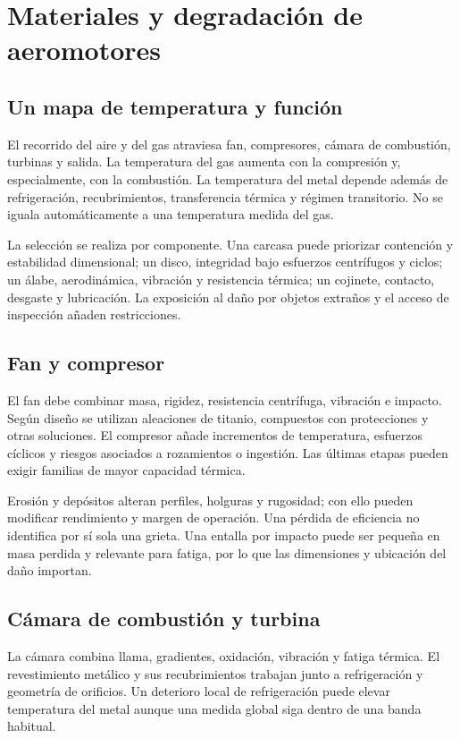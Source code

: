 \chapter{Materiales y degradación de aeromotores}\label{ch:10}
\section{Un mapa de temperatura y función}
El recorrido del aire y del gas atraviesa fan, compresores, cámara de combustión, turbinas y salida. La temperatura del gas aumenta con la compresión y, especialmente, con la combustión. La temperatura del metal depende además de refrigeración, recubrimientos, transferencia térmica y régimen transitorio. No se iguala automáticamente a una temperatura medida del gas.

La selección se realiza por componente. Una carcasa puede priorizar contención y estabilidad dimensional; un disco, integridad bajo esfuerzos centrífugos y ciclos; un álabe, aerodinámica, vibración y resistencia térmica; un cojinete, contacto, desgaste y lubricación. La exposición al daño por objetos extraños y el acceso de inspección añaden restricciones.
\section{Fan y compresor}
El fan debe combinar masa, rigidez, resistencia centrífuga, vibración e impacto. Según diseño se utilizan aleaciones de titanio, compuestos con protecciones y otras soluciones. El compresor añade incrementos de temperatura, esfuerzos cíclicos y riesgos asociados a rozamientos o ingestión. Las últimas etapas pueden exigir familias de mayor capacidad térmica.

Erosión y depósitos alteran perfiles, holguras y rugosidad; con ello pueden modificar rendimiento y margen de operación. Una pérdida de eficiencia no identifica por sí sola una grieta. Una entalla por impacto puede ser pequeña en masa perdida y relevante para fatiga, por lo que las dimensiones y ubicación del daño importan.
\section{Cámara de combustión y turbina}
La cámara combina llama, gradientes, oxidación, vibración y fatiga térmica. El revestimiento metálico y sus recubrimientos trabajan junto a refrigeración y geometría de orificios. Un deterioro local de refrigeración puede elevar temperatura del metal aunque una medida global siga dentro de una banda habitual.

